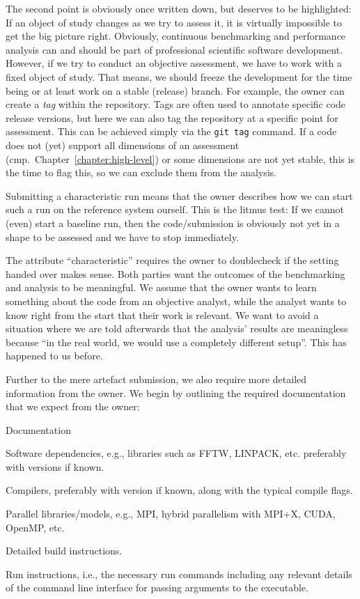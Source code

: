 \noindent
The second point is obviously once written down, but deserves to be highlighted:
If an object of study changes as we try to assess it, it is virtually impossible to get the big picture right.
Obviously, continuous benchmarking and performance analysis can and should be part of professional scientific software development.
However, if we try to conduct an objective assessment, we have to work with a fixed object of study.
That means, we should freeze the development for the time being or at least work on a stable (release) branch. For example, the owner can create a \emph{tag} within the repository. Tags are often used to annotate specific code release versions, but here we can also tag the repository at a specific point for assessment. This can be achieved simply via the \texttt{git tag} command. If a code does not (yet) support all dimensions of an assessment (cmp.~Chapter~\ref{chapter:high-level}) or some dimensions are not yet stable, this is the time to flag this, so we can exclude them from the analysis.

Submitting a characteristic run means that the owner describes how we can start such a run on the reference system ourself.
This is the litmus test:
If we cannot (even) start a baseline run, then the code/submission is obviously not yet in a shape to be assessed and we have to stop immediately. 

The attribute ``characteristic'' requires the owner to doublecheck if the setting handed over makes sense.
Both parties want the outcomes of the benchmarking and analysis to be meaningful.
We assume that the owner wants to learn something about the code from an objective analyst, while the analyst wants to know right from the start that their work is relevant.
We want to avoid a situation where we are told afterwards that the analysis' results are meaningless because ``in the real world, we would use a completely different setup''.
This has happened to us before. 

Further to the mere artefact submission, we also require more detailed information from the owner. We begin by outlining the required documentation that we expect from the owner:

\begin{checklisttitled}{Documentation}
    \item Software dependencies, e.g., libraries such as FFTW, LINPACK, etc. preferably with versions if known.
    \item Compilers, preferably with version if known, along with the typical compile flags.
    \item Parallel libraries/models, e.g., MPI, hybrid parallelism with MPI+X, CUDA, OpenMP, etc.
    \item Detailed build instructions.
    \item Run instructions, i.e., the necessary run commands including any relevant details of the command line interface for passing arguments to the executable.
\end{checklisttitled}

